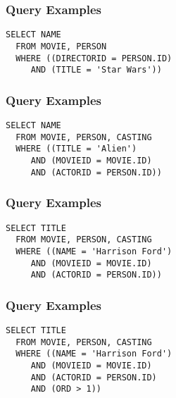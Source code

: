 \documentclass[dvipsnames]{beamer}
\theoremstyle{plain}
\begin{document}
\begin{frame}[fragile]
  \frametitle{Query Examples}

  \begin{example}
    \begin{lstlisting}
SELECT NAME
  FROM MOVIE, PERSON
  WHERE ((DIRECTORID = PERSON.ID)
     AND (TITLE = 'Star Wars'))
    \end{lstlisting}
  \end{example}
\end{frame}

\begin{frame}[fragile]
  \frametitle{Query Examples}

  \begin{example}
     \begin{lstlisting}
SELECT NAME
  FROM MOVIE, PERSON, CASTING
  WHERE ((TITLE = 'Alien')
     AND (MOVIEID = MOVIE.ID)
     AND (ACTORID = PERSON.ID))
      \end{lstlisting}
    \end{example}
\end{frame}

\begin{frame}[fragile]
  \frametitle{Query Examples}

  \begin{example}
    \begin{lstlisting}
SELECT TITLE
  FROM MOVIE, PERSON, CASTING
  WHERE ((NAME = 'Harrison Ford')
     AND (MOVIEID = MOVIE.ID)
     AND (ACTORID = PERSON.ID))
    \end{lstlisting}
  \end{example}
\end{frame}

\begin{frame}[fragile]
  \frametitle{Query Examples}

  \begin{example}
    \begin{lstlisting}
SELECT TITLE
  FROM MOVIE, PERSON, CASTING
  WHERE ((NAME = 'Harrison Ford')
     AND (MOVIEID = MOVIE.ID)
     AND (ACTORID = PERSON.ID)
     AND (ORD > 1))
    \end{lstlisting}
  \end{example}
\end{frame}
\end{document}
